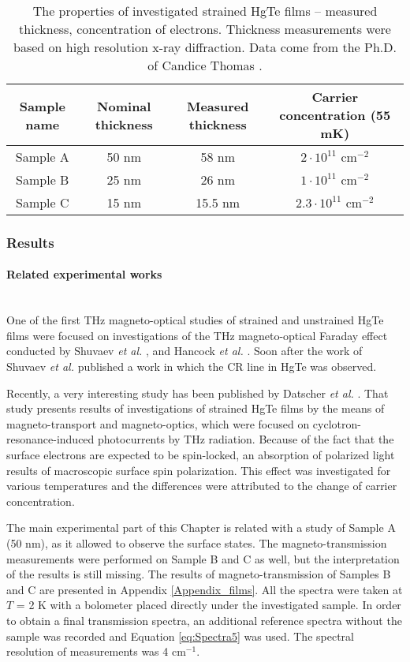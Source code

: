 \documentclass[titlepage,a4paper]{book}
\newcommand{\wciecie}{\quad\phantom{v}}
\newcommand{\myparagraph}[1]{\paragraph{#1}\mbox{}\\}
\begin{document}
\begin{table}[h]
\label{tab:MCT_films_properties}
\caption{The properties of investigated strained HgTe films -- measured thickness, concentration of electrons. Thickness measurements were based on high resolution x-ray diffraction. Data come from the Ph.D. of Candice Thomas \cite{Thomas_PhD}.}
\vspace{10pt}
\centering
\begin{tabular}{ c | c | c | c}	
\textbf{Sample name} & \textbf{Nominal thickness} & \textbf{Measured thickness} & \textbf{Carrier concentration (55 mK)}\\
\hline\hline
Sample A & 50 nm & 58 nm & $2\cdot10^{11}$ cm$^{-2}$\\ \hline
Sample B & 25 nm & 26 nm & $1\cdot10^{11}$ cm$^{-2}$\\ \hline
Sample C & 15 nm & 15.5 nm & $2.3\cdot10^{11}$ cm$^{-2}$\\ \hline
\hline 
\end{tabular}
\end{table}


\subsubsection{Results}
\myparagraph{Related experimental works}
\wciecie
One of the first THz magneto-optical studies of strained and unstrained HgTe films were focused on investigations of the THz magneto-optical Faraday effect conducted by Shuvaev \textit{et al.} \cite{Shuvaev_MCT_films2}\cite{Shuvaev_MCT_films3}, and Hancock \textit{et al.} \cite{Hancock_MCT_films}. Soon after the work of Shuvaev \textit{et al.} \cite{Shuvaev_MCT_films1} published a work in which the CR line in HgTe was observed. 

Recently, a very interesting study has been published by Datscher \textit{et al.} \cite{Ganichev_MCT_layers}. That study presents results of investigations of strained HgTe films by the means of magneto-transport and magneto-optics, which were focused on cyclotron-resonance-induced photocurrents by THz radiation. Because of the fact that the surface electrons are expected to be spin-locked, an absorption of polarized light results of macroscopic surface spin polarization. This effect was investigated for various temperatures and the differences were attributed to the change of carrier concentration.

The main experimental part of this Chapter is related with a study of Sample A (50 nm), as it allowed to observe the surface states. The magneto-transmission measurements were performed on Sample B and C as well, but the interpretation of the results is still missing. The results of magneto-transmission of Samples B and C are presented in Appendix \ref{Appendix_films}. All the spectra were taken at $T$ = 2 K with a bolometer placed directly under the investigated sample. In order to obtain a final transmission spectra, an additional reference spectra without the sample was recorded and Equation \ref{eq:Spectra5} was used. The spectral resolution of measurements was 4 cm$^{-1}$.
\end{document}
